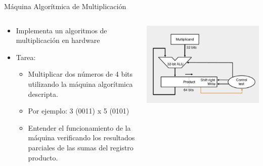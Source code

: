 \documentclass[aspectratio=169,compress]{beamer}
\begin{document}
\begin{footnotesize}
\begin{frame}{Máquina Algorítmica de Multiplicación}
\begin{columns}[onlytextwidth,T]
\column{\dimexpr\linewidth-70mm-5mm}
\bigskip
\bigskip

\begin{footnotesize}
\begin{itemize}
\item Implementa un algoritmos de multiplicación en hardware
\item Tarea:
\begin{footnotesize}
\begin{itemize}
\item Multiplicar dos números de 4 bits utilizando la máquina algorítmica descripta.
\bigskip
\item Por ejemplo: 3 (0011) x 5 (0101)
\bigskip
\item Entender el funcionamiento de la máquina verificando los resultados parciales de las sumas del registro producto.
\end{itemize}
\end{footnotesize}
\bigskip
\end{itemize}
\end{footnotesize}

       \column{60mm}
\includegraphics[scale=0.25]{images/maq-alg-mult.jpg} 


\end{columns}
\end{frame}
\end{footnotesize}
\end{document}

